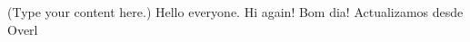 \documentclass{article}
\begin{document}
(Type your content here.)
Hello everyone.
Hi again!
Bom dia!
Actualizamos desde Overl
\end{document}
